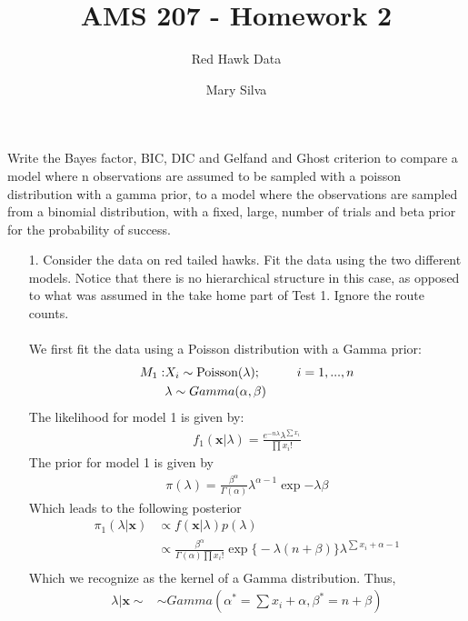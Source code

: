 \documentclass[a4paper, 9pt]{article}
\title{AMS 207 - Homework 2}
\date{Mary Silva}
\author{Red Hawk Data}
\newcommand{\xbold}{ \pmb{x} }
\newcommand\tab[1][1cm]{\hspace*{#1}}
\newcommand{\Poisson}{\text{Poisson}}
\begin{document}
\maketitle


Write the Bayes factor, BIC, DIC and Gelfand and Ghost criterion to compare a model where n observations are assumed to be sampled with a poisson distribution with a gamma prior, to a model where the observations are sampled from a binomial distribution, with a fixed, large, number of trials and beta prior for the probability of success.

\begin{enumerate}
\item[1.] Consider the data on red tailed hawks. Fit the data using the two different models. Notice that there is no hierarchical structure in this case, as opposed to what was assumed in the take home part of Test 1. Ignore the route counts.\\
\\

We first fit the data using a Poisson distribution with a Gamma prior:
\begin{align*}
    M_1 :& X_i \sim \Poisson (\lambda); \tab i=1,...,n\\
        &\lambda \sim Gamma(\alpha, \beta)
\end{align*}
The likelihood for model 1 is given by:
\begin{align*}
    f_1(\pmb{x}|\lambda) = \frac{e^{-n\lambda}\lambda^{\sum x_i}}{\prod x_i!} 
\end{align*}
The prior for model 1 is given by
\begin{align*}
    \pi(\lambda) =\frac{\beta^\alpha}{\Gamma(\alpha)}\lambda^{\alpha - 1} \exp{-\lambda \beta}
\end{align*}
Which leads to the following posterior
\begin{align}
    \pi_1(\lambda|\pmb{x}) &\propto f(\pmb{x}|\lambda) p(\lambda)\\
    &\propto \frac{\beta^\alpha}{\Gamma(\alpha) \prod x_i!}\exp\Big\{-\lambda(n+\beta)\Big\}\lambda^{\sum x_i + \alpha-1}\\
\end{align}
Which we recognize as the kernel of a Gamma distribution. Thus, 
\begin{align}
    \lambda|\xbold \sim & \sim Gamma\left(\alpha^{*} = \sum x_i + \alpha, \beta^{*} = n + \beta\right)
\end{align}


\end{enumerate}
\end{document}
